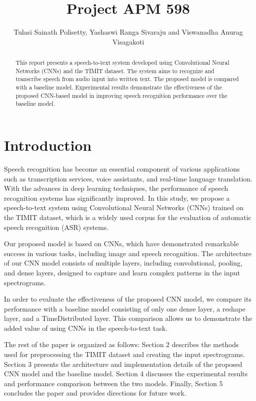 \documentclass[12pt]{article}
\title{Project APM 598}
\author{Tulasi Sainath Polisetty, Yashaswi Ranga Sivaraju and Viswanadha Anurag Visagakoti}
\begin{document}
\maketitle


\begin{abstract}

This report presents a speech-to-text system developed using Convolutional Neural Networks (CNNs) and the TIMIT dataset. The system aims to recognize and transcribe speech from audio input into written text. The proposed model is compared with a baseline model. Experimental results demonstrate the effectiveness of the proposed CNN-based model in improving speech recognition performance over the baseline model.

\end{abstract}

\section{Introduction}

Speech recognition has become an essential component of various applications such as transcription services, voice assistants, and real-time language translation. With the advances in deep learning techniques, the performance of speech recognition systems has significantly improved. In this study, we propose a speech-to-text system using Convolutional Neural Networks (CNNs) trained on the TIMIT dataset, which is a widely used corpus for the evaluation of automatic speech recognition (ASR) systems.

Our proposed model is based on CNNs, which have demonstrated remarkable success in various tasks, including image and speech recognition. The architecture of our CNN model consists of multiple layers, including convolutional, pooling, and dense layers, designed to capture and learn complex patterns in the input spectrograms.

In order to evaluate the effectiveness of the proposed CNN model, we compare its performance with a baseline model consisting of only one dense layer, a reshape layer, and a TimeDistributed layer. This comparison allows us to demonstrate the added value of using CNNs in the speech-to-text task.

The rest of the paper is organized as follows: Section 2 describes the methods used for preprocessing the TIMIT dataset and creating the input spectrograms. Section 3 presents the architecture and implementation details of the proposed CNN model and the baseline model. Section 4 discusses the experimental results and performance comparison between the two models. Finally, Section 5 concludes the paper and provides directions for future work.
\end{document}

